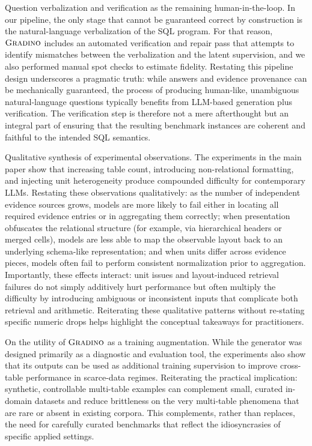 \documentclass[11pt]{article}
\newcommand{\name}{$\textsc{Gradino}$\xspace}
\begin{document}
Question verbalization and verification as the remaining human-in-the-loop. In our pipeline, the only stage that cannot be guaranteed correct by construction is the natural-language verbalization of the SQL program. For that reason, \name{} includes an automated verification and repair pass that attempts to identify mismatches between the verbalization and the latent supervision, and we also performed manual spot checks to estimate fidelity. Restating this pipeline design underscores a pragmatic truth: while answers and evidence provenance can be mechanically guaranteed, the process of producing human-like, unambiguous natural-language questions typically benefits from LLM-based generation plus verification. The verification step is therefore not a mere afterthought but an integral part of ensuring that the resulting benchmark instances are coherent and faithful to the intended SQL semantics.

Qualitative synthesis of experimental observations. The experiments in the main paper show that increasing table count, introducing non-relational formatting, and injecting unit heterogeneity produce compounded difficulty for contemporary LLMs. Restating these observations qualitatively: as the number of independent evidence sources grows, models are more likely to fail either in locating all required evidence entries or in aggregating them correctly; when presentation obfuscates the relational structure (for example, via hierarchical headers or merged cells), models are less able to map the observable layout back to an underlying schema-like representation; and when units differ across evidence pieces, models often fail to perform consistent normalization prior to aggregation. Importantly, these effects interact: unit issues and layout-induced retrieval failures do not simply additively hurt performance but often multiply the difficulty by introducing ambiguous or inconsistent inputs that complicate both retrieval and arithmetic. Reiterating these qualitative patterns without re-stating specific numeric drops helps highlight the conceptual takeaways for practitioners.

On the utility of \name{} as a training augmentation. While the generator was designed primarily as a diagnostic and evaluation tool, the experiments also show that its outputs can be used as additional training supervision to improve cross-table performance in scarce-data regimes. Reiterating the practical implication: synthetic, controllable multi-table examples can complement small, curated in-domain datasets and reduce brittleness on the very multi-table phenomena that are rare or absent in existing corpora. This complements, rather than replaces, the need for carefully curated benchmarks that reflect the idiosyncrasies of specific applied settings.
\end{document}
